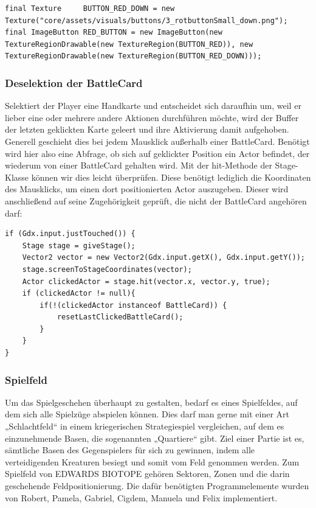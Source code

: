 \begin{lstlisting}
final Texture     BUTTON_RED_DOWN = new Texture("core/assets/visuals/buttons/3_rotbuttonSmall_down.png");
final ImageButton RED_BUTTON = new ImageButton(new TextureRegionDrawable(new TextureRegion(BUTTON_RED)), new TextureRegionDrawable(new TextureRegion(BUTTON_RED_DOWN)));
\end{lstlisting}

\subsubsection{Deselektion der BattleCard}
Selektiert der Player eine Handkarte und entscheidet sich daraufhin um, weil er lieber eine oder mehrere andere Aktionen durchführen möchte, wird der Buffer der letzten geklickten Karte geleert und ihre Aktivierung damit aufgehoben. Generell geschieht dies bei jedem Mausklick außerhalb einer BattleCard.
Benötigt wird hier also eine Abfrage, ob sich auf geklickter Position ein Actor befindet, der wiederum von einer BattleCard gehalten wird.
Mit der hit-Methode der Stage-Klasse können wir dies leicht überprüfen. Diese benötigt lediglich die Koordinaten des Mausklicks, um einen dort positionierten Actor auszugeben. Dieser wird anschließend auf seine Zugehörigkeit geprüft, die nicht der BattleCard angehören darf:

\begin{lstlisting}
if (Gdx.input.justTouched()) {
	Stage stage = giveStage();
	Vector2 vector = new Vector2(Gdx.input.getX(), Gdx.input.getY());
	stage.screenToStageCoordinates(vector);
	Actor clickedActor = stage.hit(vector.x, vector.y, true);
	if (clickedActor != null){
		if(!(clickedActor instanceof BattleCard)) {
			resetLastClickedBattleCard();
		}
	}
}
\end{lstlisting}

\subsubsection{Spielfeld}
Um das Spielgeschehen überhaupt zu gestalten, bedarf es eines Spielfeldes, auf dem sich alle Spielzüge abspielen können.
Dies darf man gerne mit einer Art „Schlachtfeld“ in einem kriegerischen Strategiespiel vergleichen, auf dem es einzunehmende Basen, die sogenannten „Quartiere“ gibt. Ziel einer Partie ist es, sämtliche Basen des Gegenspielers für sich zu gewinnen, indem alle verteidigenden Kreaturen besiegt und somit vom Feld genommen werden.
Zum Spielfeld von EDWARDS BIOTOPE gehören Sektoren, Zonen und die darin geschehende Feldpositionierung. Die dafür benötigten Programmelemente wurden von Robert, Pamela, Gabriel, Cigdem, Manuela und Felix implementiert.


